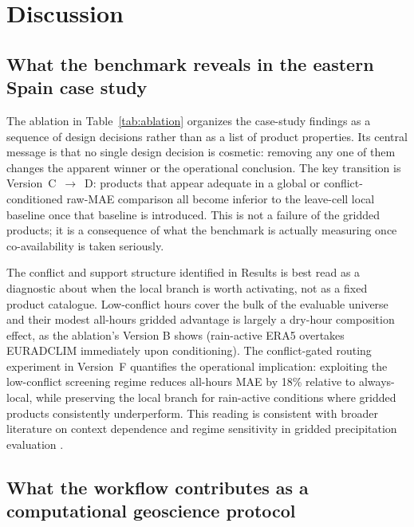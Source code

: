 \documentclass[preprint,12pt]{elsarticle}
\begin{document}
\section{Discussion}

\subsection{What the benchmark reveals in the eastern Spain case study}

The ablation in Table~\ref{tab:ablation} organizes the case-study findings as a sequence of design decisions rather than as a list of product properties. Its central message is that no single design decision is cosmetic: removing any one of them changes the apparent winner or the operational conclusion. The key transition is Version~C~$\to$~D: products that appear adequate in a global or conflict-conditioned raw-MAE comparison all become inferior to the leave-cell local baseline once that baseline is introduced. This is not a failure of the gridded products; it is a consequence of what the benchmark is actually measuring once co-availability is taken seriously.

The conflict and support structure identified in Results is best read as a diagnostic about when the local branch is worth activating, not as a fixed product catalogue. Low-conflict hours cover the bulk of the evaluable universe and their modest all-hours gridded advantage is largely a dry-hour composition effect, as the ablation's Version B shows (rain-active ERA5 overtakes EURADCLIM immediately upon conditioning). The conflict-gated routing experiment in Version~F quantifies the operational implication: exploiting the low-conflict screening regime reduces all-hours MAE by 18\% relative to always-local, while preserving the local branch for rain-active conditions where gridded products consistently underperform. This reading is consistent with broader literature on context dependence and regime sensitivity in gridded precipitation evaluation \citep{kidd2011status,maggioni2018review,derin2016complexterrain,yu2020highdensity,tessema2020representativeness,tian2018gaugedensity,tozer2012proxy,porcu2014uncertainties,peino2024westernmed,gomiscebolla2023spain}.

\subsection{What the workflow contributes as a computational geoscience protocol}
\end{document}
